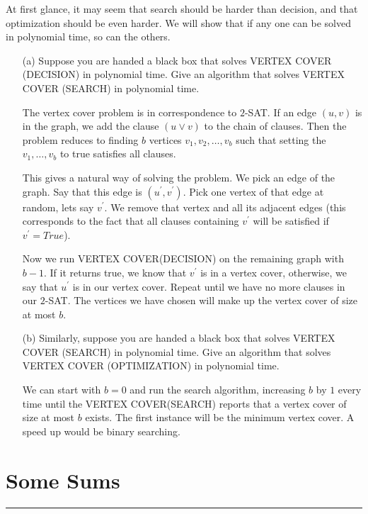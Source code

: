\documentclass{article}
\begin{document}
At first glance, it may seem that search should be harder than decision, and that optimization should be even harder. We will show that if any one can be solved in polynomial time, so can the others.
    \begin{itemize}
        \item [(a)] Suppose you are handed a black box that solves VERTEX COVER (DECISION) in polynomial time. Give an algorithm that solves VERTEX COVER (SEARCH) in polynomial time.
            \begin{answer}
                The vertex cover problem is in correspondence to $2$-SAT. If an edge $(u, v)$ is in the graph, we add the clause $(u \lor v)$ to the chain of clauses. Then the problem reduces to finding $b$ vertices $v_{1}, v_{2}, \ldots, v_{b}$ such that setting the $v_{1}, \ldots, v_{b}$ to true satisfies all clauses. 

                This gives a natural way of solving the problem. We pick an edge of the graph. Say that this edge is $(u^{\prime}, v^{\prime})$. Pick one vertex of that edge at random, lets say $v^{\prime}$. We remove that vertex and all its adjacent edges (this corresponds to the fact that all clauses containing $v^{\prime}$ will be satisfied if $v^{\prime} = True$). 

                Now we run VERTEX COVER(DECISION) on the remaining graph with $b - 1$. If it returns true, we know that $v^{\prime}$ is in a vertex cover, otherwise, we say that $u^{\prime}$ is in our vertex cover. Repeat until we have no more clauses in our $2$-SAT. The vertices we have chosen will make up the vertex cover of size at most $b$.
            \end{answer}

        \item [(b)] Similarly, suppose you are handed a black box that solves VERTEX COVER (SEARCH) in polynomial time. Give an algorithm that solves VERTEX COVER (OPTIMIZATION) in polynomial time.
            \begin{answer}
                We can start with $b = 0$ and run the search algorithm, increasing $b$ by $1$ every time until the VERTEX COVER(SEARCH) reports that a vertex cover of size at most $b$ exists. The first instance will be the minimum vertex cover. A speed up would be binary searching.
            \end{answer}
    \end{itemize}

\newpage
\section*{Some Sums}
\hrule
\end{document}
